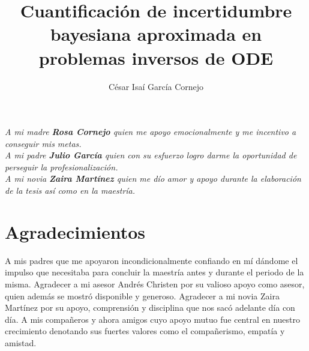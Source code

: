 \documentclass[letterpaper,12pt,twoside]{book}  %
\author{César Isaí García Cornejo}
\title{Cuantificación de incertidumbre bayesiana aproximada en problemas inversos de ODE}
\begin{document}
\maketitle  %

\thispagestyle{empty}  %

\frontmatter

\chapter*{}
\begin{flushright}%
  \emph{A mi madre \textbf{Rosa Cornejo} quien me apoyo emocionalmente y me incentivo a conseguir mis metas. \\A mi padre \textbf{Julio García} quien con su esfuerzo logro darme la oportunidad de perseguir la profesionalización.\\
  A mi novia \textbf{Zaira Martínez} quien me dío amor y apoyo durante la elaboración de la tesis así como en la maestría. }
  \thispagestyle{empty}
\end{flushright}



\chapter*{Agradecimientos}

A mis padres que me apoyaron incondicionalmente confiando en mí dándome el impulso que necesitaba para concluir la maestría antes y durante el periodo de la misma. Agradecer a mi asesor Andrés Christen por su valioso apoyo como asesor, quien además se mostró disponible y generoso. Agradecer a mi novia Zaira Martínez por su apoyo, comprensión y disciplina que nos sacó adelante día con día. A mis compañeros y ahora amigos cuyo apoyo mutuo fue central en nuestro crecimiento denotando sus fuertes valores como el compañerismo, empatía y amistad.
\end{document}
